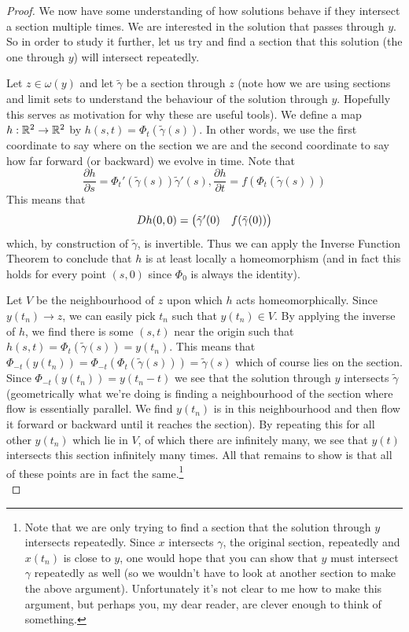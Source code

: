 \begin{proof}
We now have some understanding of how solutions behave if they intersect a section multiple times. We are interested in the solution that passes through $y$. So in order to study it further, let us try and find a section that this solution (the one through $y$) will intersect repeatedly.

Let $z \in \omega(y)$ and let $\tilde{\gamma}$ be a section through $z$ (note how we are using sections and limit sets to understand the behaviour of the solution through $y$. Hopefully this serves as motivation for why these are useful tools). We define a map $h: \mathbb{R}^2 \to \mathbb{R}^2$ by $h(s, t) = \Phi_t(\tilde{\gamma}(s))$. In other words, we use the first coordinate to say where on the section we are and the second coordinate to say how far forward (or backward) we evolve in time. Note that 
$$ \frac{\partial h}{\partial s} = \Phi_t'(\tilde{\gamma}(s)) \tilde{\gamma}'(s), \frac{\partial h}{\partial t} = f(\Phi_t(\tilde{\gamma}(s))) $$
This means that
$$ Dh(0, 0) = \begin{pmatrix} \tilde{\gamma}'(0) & f(\tilde{\gamma}(0)) \end{pmatrix} $$
which, by construction of $\tilde{\gamma}$, is invertible. Thus we can apply the Inverse Function Theorem to conclude that $h$ is at least locally a homeomorphism (and in fact this holds for every point $(s, 0)$ since $\Phi_0$ is always the identity). 

Let $V$ be the neighbourhood of $z$ upon which $h$ acts homeomorphically. Since $y(t_n) \to z$, we can easily pick $t_n$ such that $y(t_n) \in V$. By applying the inverse of $h$, we find there is some $(s, t)$ near the origin such that $h(s, t) = \Phi_{t}(\tilde{\gamma}(s)) = y(t_n)$. This means that $\Phi_{-t}(y(t_n)) = \Phi_{-t}(\Phi_{t}(\tilde{\gamma}(s))) = \tilde{\gamma}(s)$ which of course lies on the section. Since $\Phi_{-t}(y(t_n)) = y(t_n - t)$ we see that the solution through $y$ intersects $\tilde{\gamma}$ (geometrically what we're doing is finding a neighbourhood of the section where flow is essentially parallel. We find $y(t_n)$ is in this neighbourhood and then flow it forward or backward until it reaches the section). By repeating this for all other $y(t_n)$ which lie in $V$, of which there are infinitely many, we see that $y(t)$ intersects this section infinitely many times. All that remains to show is that all of these points are in fact the same.\footnote{Note that we are only trying to find a section that the solution through $y$ intersects repeatedly. Since $x$ intersects $\gamma$, the original section, repeatedly and $x(t_n)$ is close to $y$, one would hope that you can show that $y$ must intersect $\gamma$ repeatedly as well (so we wouldn't have to look at another section to make the above argument). Unfortunately it's not clear to me how to make this argument, but perhaps you, my dear reader, are clever enough to think of something.}\\


\end{proof}
